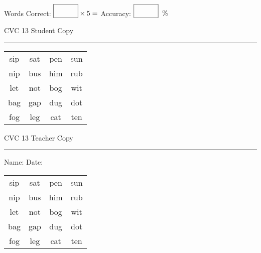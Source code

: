 \documentclass{memoir}
\begin{document}
\small

Words Correct: $\fbox{\phantom{\huge 100}} \times 5 = $ Accuracy: $\fbox{\phantom{\huge 100}}\;\; \%$ 

\vfill

\newpage


\footnotesize \noindent
CVC 13 \hfill Student Copy
\smallskip
\hrule

\Large

\setlength{\tabcolsep}{14pt}
\def\arraystretch{2}

{\selectfont


\begin{vplace}[0.5]
\begin{center}
\begin{tabular}{cccc}
sip & sat & pen & sun \\
nip & bus & him & rub \\
let & not & bog & wit \\
bag & gap & dug & dot \\
fog & leg & cat & ten \\
\end{tabular}
\end{center}
\end{vplace}

}

\newpage

\footnotesize \noindent
CVC 13 \hfill Teacher Copy
\smallskip
\hrule

\small

\vfill

\noindent
Name: \underline{\hspace{1.75in}} \hfill Date: \underline{\hspace{1in}}

\Large

{\selectfont


\begin{vplace}[0.5]
\begin{center}
\begin{tabular}{cccc}
sip & sat & pen & sun \\
nip & bus & him & rub \\
let & not & bog & wit \\
bag & gap & dug & dot \\
fog & leg & cat & ten \\
\end{tabular}
\end{center}
\end{vplace}



}
\end{document}
